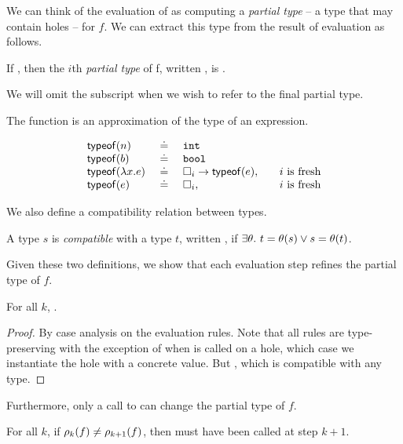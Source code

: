 We can think of the evaluation of  as computing a
\emph{partial type} -- a type that may contain holes -- for $f$.
%
We can extract this type from the result of evaluation as follows.
%
\begin{defn}
\label{defn:partial-type}
  If , then the $i$th
  \emph{partial type} of f, written ,
  is .

  We will omit the subscript when we wish to refer to the final partial
  type. 
\end{defn}
%
The \typeof{} function is an approximation of the type of an expression.
\begin{defn}
\label{def:typeof}
  \[
  \begin{array}{lcll}
    \mathsf{typeof}(n)   & \ \doteq\  & \mathtt{int} & \\
    \mathsf{typeof}(b)   & \ \doteq\  & \mathtt{bool} & \\
    \mathsf{typeof}(\lambda x. e) & \ \doteq\  & {\square_{i}} \rightarrow \mathsf{typeof}(e), & \quad \text{$i$ is fresh} \\
    \mathsf{typeof}(e) & \ \doteq\  & \square_{i}, & \quad \text{$i$ is fresh} \\
  \end{array}
  \]
\end{defn}
%
We also define a compatibility relation between types.
%
\begin{defn}
\label{defn:type-compat}
  A type $s$ is \emph{compatible} with a type $t$, written , if
  $\exists \theta.\ t = \theta(s) \lor s = \theta(t)$.
\end{defn}
%
Given these two definitions, we show that each evaluation step
refines the partial type of $f$.
%
\begin{lem}
\label{lem:refine-partial}
  For all $k$, .
\end{lem}
\begin{proof}
  By case analysis on the evaluation rules. 
  Note that all rules are type-preserving with the exception of when
  \forcesym is called on a hole, which case we instantiate the hole with
  a concrete value.
  But \hastype{\ehole{}}{\thole{}}, which is compatible with any type.
\end{proof}
%
Furthermore, only a call to \forcesym can change the partial type of $f$.
%
\begin{lem}
\label{lem:force-inst}
  For all $k$, if $\rho_{k}(f) \neq \rho_{k+1}(f)$, then \forcesym must
  have been called at step $k+1$.
\end{lem}
